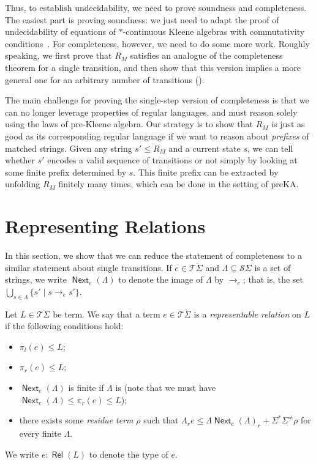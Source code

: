 \documentclass[a4paper,UKenglish,cleveref, autoref, thm-restate]{lipics-v2021}
\DeclareMathOperator{\Next}{\mathsf{Next}}
\DeclareMathOperator{\Rel}{\mathsf{Rel}}
\begin{document}
Thus, to establish undecidability, we need to prove soundness and completeness.
The easiest part is proving soundness: we just need to adapt the proof of
undecidability of equations of $*$-continuous Kleene algebras with commutativity
conditions~\cite{Kozen_1996}.
%
For completeness, however, we need to do some more work. Roughly speaking, we
first prove that $R_M$ satisfies an analogue of the completeness theorem for a
single transition, and then show that this version implies a more general one
for an arbitrary number of transitions ().

The main challenge for proving the single-step version of completeness is that
we can no longer leverage properties of regular languages, and must reason
solely using the laws of pre-Kleene algebra.  Our strategy is to show that $R_M$
is just as good as its corresponding regular language if we want to reason about
\emph{prefixes} of matched strings.  Given any string $s' \leq R_M$ and a
current state $s$, we can tell whether $s'$ encodes a valid sequence of
transitions or not simply by looking at some finite prefix determined by $s$.
This finite prefix can be extracted by unfolding $R_M$ finitely many times,
which can be done in the setting of preKA.

\section{Representing Relations}
\label{sec:relations}

In this section, we show that we can reduce the statement of completeness to a
similar statement about single transitions.  If $e  \in  \mathcal{T}\ddot{ \Sigma }$ and
$ \Lambda   \subseteq  \mathcal{S} \Sigma $ is a set of strings, we write $\Next_e( \Lambda )$ to denote the
image of $ \Lambda $ by $ \to _e$; that is, the set $ \bigcup _{s  \in   \Lambda } \{ s'  \mid  s  \to _e s' \}$.

\begin{definition}
  \label{def:representable-relation}
  Let $L  \in  \mathcal{T} \Sigma $ be term.  We say that a term $e  \in  \mathcal{T}\ddot{ \Sigma }$
  is a \emph{representable relation} on $L$ if the following conditions hold:
  \begin{itemize}
  \item $ \pi _l(e)  \leq  L$;
  \item $ \pi _r(e)  \leq  L$;
  \item $\Next_e( \Lambda )$ is finite if $ \Lambda $ is (note that we must have
    $\Next_e( \Lambda )  \leq   \pi _r(e)  \leq  L$);
  \item there exists some \emph{residue term} $ \rho $ such that
    $ \Lambda _re  \leq   \Lambda \Next_e( \Lambda )_r +  \Sigma ^* \Sigma ^{ \neq } \rho $ for every finite $ \Lambda $.
  \end{itemize}
  We write $e : \Rel(L)$ to denote the type of $e$.
\end{definition}
\end{document}
